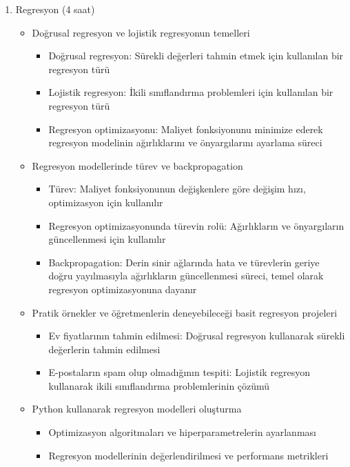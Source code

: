 \documentclass[12pt]{article}
\begin{document}
\begin{enumerate}
    \item Regresyon (4 saat)
    \begin{itemize}
        \item Doğrusal regresyon ve lojistik regresyonun temelleri
        \begin{itemize}
            \item Doğrusal regresyon: Sürekli değerleri tahmin etmek için kullanılan bir regresyon türü
            \item Lojistik regresyon: İkili sınıflandırma problemleri için kullanılan bir regresyon türü
            \item Regresyon optimizasyonu: Maliyet fonksiyonunu minimize ederek regresyon modelinin ağırlıklarını ve önyargılarını ayarlama süreci
        \end{itemize}
        \item Regresyon modellerinde türev ve backpropagation
        \begin{itemize}
            \item Türev: Maliyet fonksiyonunun değişkenlere göre değişim hızı, optimizasyon için kullanılır
            \item Regresyon optimizasyonunda türevin rolü: Ağırlıkların ve önyargıların güncellenmesi için kullanılır
            \item Backpropagation: Derin sinir ağlarında hata ve türevlerin geriye doğru yayılmasıyla ağırlıkların güncellenmesi süreci, temel olarak regresyon optimizasyonuna dayanır
        \end{itemize}
        \item Pratik örnekler ve öğretmenlerin deneyebileceği basit regresyon projeleri
        \begin{itemize}
            \item Ev fiyatlarının tahmin edilmesi: Doğrusal regresyon kullanarak sürekli değerlerin tahmin edilmesi
            \item E-postaların spam olup olmadığının tespiti: Lojistik regresyon kullanarak ikili sınıflandırma problemlerinin çözümü
        \end{itemize}
        \item Python kullanarak regresyon modelleri oluşturma
        \begin{itemize}
            \item Optimizasyon algoritmaları ve hiperparametrelerin ayarlanması
            \item Regresyon modellerinin değerlendirilmesi ve performans metrikleri
        \end{itemize}
    \end{itemize}


\end{enumerate}
\end{document}
